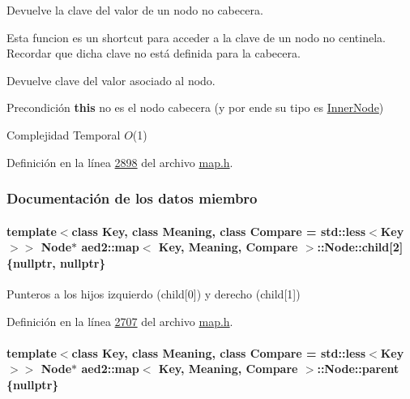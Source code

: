 Devuelve la clave del valor de un nodo no cabecera. 

Esta funcion es un shortcut para acceder a la clave de un nodo no centinela. Recordar que dicha clave no está definida para la cabecera.

\begin{DoxyReturn}{Devuelve}
clave del valor asociado al nodo.
\end{DoxyReturn}
\begin{DoxyPrecond}{Precondición}
{\bfseries this} no es el nodo cabecera (y por ende su tipo es \hyperlink{structaed2_1_1map_1_1InnerNode}{Inner\-Node})
\end{DoxyPrecond}

\begin{DoxyDescription}
\item[Complejidad Temporal]$O$(1)
\end{DoxyDescription}

Definición en la línea \hyperlink{map_8h_source_l02898}{2898} del archivo \hyperlink{map_8h_source}{map.\-h}.



\subsubsection{Documentación de los datos miembro}
\hypertarget{structaed2_1_1map_1_1Node_a7d65c374c73c443a46d8fc224aff9e82_a7d65c374c73c443a46d8fc224aff9e82}{
\paragraph[{child}]{\setlength{\rightskip}{0pt plus 5cm}template$<$class Key, class Meaning, class Compare = std\-::less$<$\-Key$>$$>$ {\bf Node}$\ast$ {\bf aed2\-::map}$<$ Key, Meaning, Compare $>$\-::Node\-::child\mbox{[}2\mbox{]} \{nullptr, nullptr\}}}\label{structaed2_1_1map_1_1Node_a7d65c374c73c443a46d8fc224aff9e82_a7d65c374c73c443a46d8fc224aff9e82}


Punteros a los hijos izquierdo (child\mbox{[}0\mbox{]}) y derecho (child\mbox{[}1\mbox{]}) 



Definición en la línea \hyperlink{map_8h_source_l02707}{2707} del archivo \hyperlink{map_8h_source}{map.\-h}.

\hypertarget{structaed2_1_1map_1_1Node_ab6a5f9e471b311755e4a56834086cb90_ab6a5f9e471b311755e4a56834086cb90}{
\paragraph[{parent}]{\setlength{\rightskip}{0pt plus 5cm}template$<$class Key, class Meaning, class Compare = std\-::less$<$\-Key$>$$>$ {\bf Node}$\ast$ {\bf aed2\-::map}$<$ Key, Meaning, Compare $>$\-::Node\-::parent \{nullptr\}}}\label{structaed2_1_1map_1_1Node_ab6a5f9e471b311755e4a56834086cb90_ab6a5f9e471b311755e4a56834086cb90}


